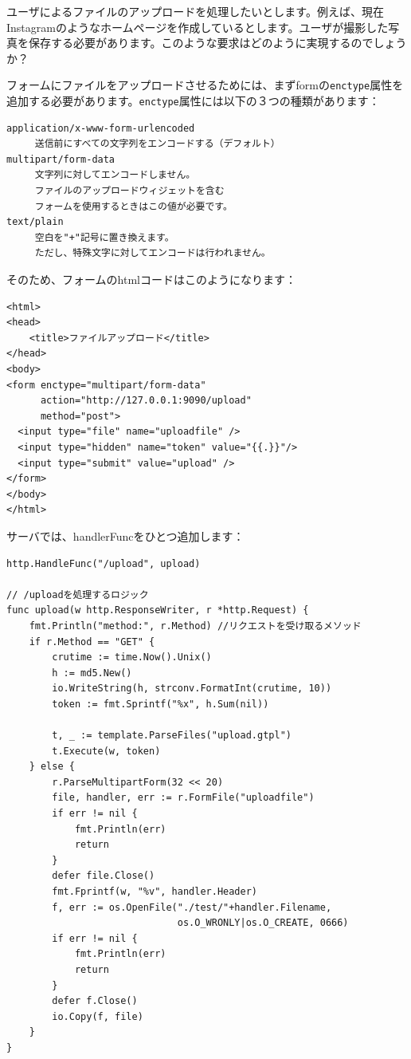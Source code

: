 ユーザによるファイルのアップロードを処理したいとします。例えば、現在Instagramのようなホームページを作成しているとします。ユーザが撮影した写真を保存する必要があります。このような要求はどのように実現するのでしょうか？

フォームにファイルをアップロードさせるためには、まずformの\texttt{enctype}属性を追加する必要があります。\texttt{enctype}属性には以下の３つの種類があります：


\begin{lstlisting}[numbers=none]
application/x-www-form-urlencoded
     送信前にすべての文字列をエンコードする（デフォルト）
multipart/form-data
     文字列に対してエンコードしません。
     ファイルのアップロードウィジェットを含む
     フォームを使用するときはこの値が必要です。
text/plain
     空白を"+"記号に置き換えます。
     ただし、特殊文字に対してエンコードは行われません。
\end{lstlisting}

そのため、フォームのhtmlコードはこのようになります：

\begin{lstlisting}[numbers=none]
<html>
<head>
    <title>ファイルアップロード</title>
</head>
<body>
<form enctype="multipart/form-data"
      action="http://127.0.0.1:9090/upload"
      method="post">
  <input type="file" name="uploadfile" />
  <input type="hidden" name="token" value="{{.}}"/>
  <input type="submit" value="upload" />
</form>
</body>
</html>
\end{lstlisting}

サーバでは、handlerFuncをひとつ追加します：

\begin{lstlisting}[numbers=none]
http.HandleFunc("/upload", upload)

// /uploadを処理するロジック
func upload(w http.ResponseWriter, r *http.Request) {
    fmt.Println("method:", r.Method) //リクエストを受け取るメソッド
    if r.Method == "GET" {
        crutime := time.Now().Unix()
        h := md5.New()
        io.WriteString(h, strconv.FormatInt(crutime, 10))
        token := fmt.Sprintf("%x", h.Sum(nil))

        t, _ := template.ParseFiles("upload.gtpl")
        t.Execute(w, token)
    } else {
        r.ParseMultipartForm(32 << 20)
        file, handler, err := r.FormFile("uploadfile")
        if err != nil {
            fmt.Println(err)
            return
        }
        defer file.Close()
        fmt.Fprintf(w, "%v", handler.Header)
        f, err := os.OpenFile("./test/"+handler.Filename,
                              os.O_WRONLY|os.O_CREATE, 0666)
        if err != nil {
            fmt.Println(err)
            return
        }
        defer f.Close()
        io.Copy(f, file)
    }
}
\end{lstlisting}

